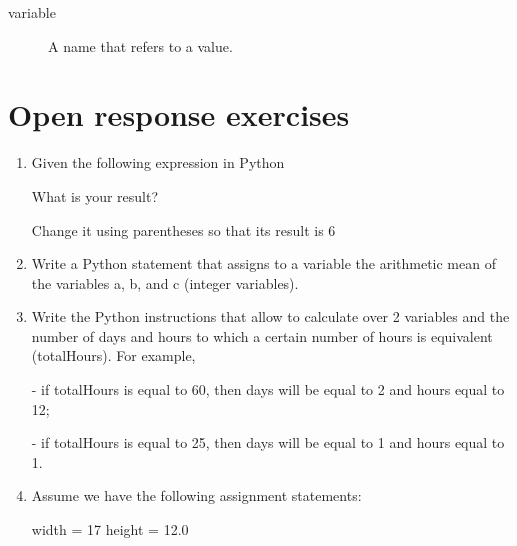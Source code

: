 
\begin{description}
\item[variable]
A name that refers to a value.
\end{description}


\newpage

\hypertarget{ejercicios}{%
\section*{Open response exercises}\label{ejercicios}}

\begin{enumerate}
\setlength\itemsep{2em}

\item Given the following expression in Python


What is your result?

Change it using parentheses so that its result is 6





\item Write a Python statement that assigns to a variable the arithmetic mean of the variables a, b, and c (integer variables).


\item Write the Python instructions that allow to calculate over 2 variables  and  the number of days and hours to which a certain number of hours is equivalent (totalHours). For example,

- if totalHours is equal to 60, then days will be equal to 2 and hours equal to 12;

- if totalHours is equal to 25, then days will be equal to 1 and hours equal to 1.



\item Assume we have the following assignment statements:
\begin{python}
    width = 17
    height = 12.0
\end{python}


\end{enumerate}
